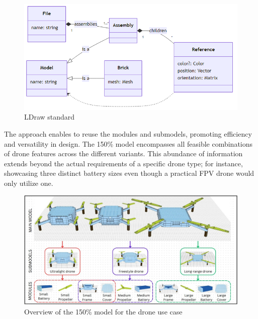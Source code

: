 \documentclass[sigconf,review]{acmart}
\begin{document}
\begin{figure}[htbp]
    \includegraphics[width=\columnwidth]{./ldraw-standard.png}
    \caption{LDraw standard}
    \label{fig:ldraw-standard}
\end{figure}

The approach enables to reuse the modules and submodels, promoting efficiency and versatility in design. 
The 150\% model encompasses all feasible combinations of drone features across the different variants. 
This abundance of information extends beyond the actual requirements of a specific drone type; for instance, showcasing three distinct battery sizes even though a practical FPV drone would only utilize one.



\begin{figure}[htbp]
    \includegraphics[width=\textwidth]{./150_MODEL_7.jpg}
    \caption{Overview of the 150\% model for the drone use case}
    \label{fig:150-model}
\end{figure}
\end{document}
